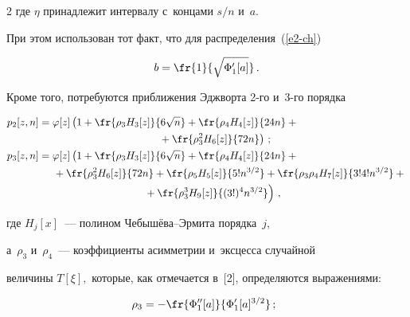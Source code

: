 \begin{multicols}{2}
 где $\eta$ принадлежит интервалу с~концами $s/n$ и~$a$. 


 При этом использован тот факт, что для распределения~(\ref{e2-ch})


 $$


 b=\fr{1}{\sqrt{\Phi'_1[a]}}\,.


 $$





 Кроме того, потребуются приближения Эдж\-вор\-та 2-го и~3-го порядка


  \begin{align}


 p_2[z,n]&=\varphi[z]\left( 1 + \fr{\rho_3 H_3[z]}{ 6\sqrt {n }} +


 \fr{\rho_4 H_4[z]}{24n} +{}\right.\notag\\


 &\hspace*{40mm}\left.{}+ \fr{\rho_3^2 H_6[z]}{72n} \right)\,;


 \label{e9-ch}\\


 p_3[z,n]&=\varphi[z]\left( 1 + \fr{\rho_3 H_3[z]}{ 6\sqrt {n }} +


 \fr{\rho_4 H_4[z]}{24n} +{}\right.\notag\\


  &\hspace*{5mm}


{} + \fr{\rho_3^2 H_6[z]}{72n}+\fr{\rho_5 H_5[z]}{5! n^{3/2}}


 +\fr{\rho_3 \rho_4 H_7[z]}{3!4! n^{3/2}}+{}\notag\\


&\hspace*{35mm} \left.{}+ \fr{\rho_3^3 H_9[z]}{(3!)^4 n^{3/2}}


 \right)\,,\!


 \label{e10-ch}


 \end{align}


 где $H_j[x]$~--- полином Че\-бы\-шё\-ва--Эр\-ми\-та порядка~$j$, 


 а~$\rho_3$ и~$\rho_4$~--- коэффициенты асимметрии и~эксцесса случайной 


 величины $T[\xi],$ которые, как отмечается в~[2], определяются выражениями:


 \begin{equation}


 \rho_3  =  - \fr{\Phi''_1 [a]}{\Phi'_1[a]^{3/2}}\,;\enskip



\end{equation}
\end{multicols}
